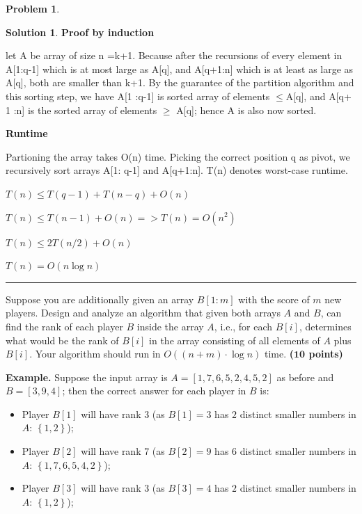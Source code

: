 \documentclass{article}
\theoremstyle{definition}
\newtheorem{problem}{Problem}
\def\fline{\rule{0.75\linewidth}{0.5pt}}
\newcommand{\finishline}{\begin{center}\fline\end{center}}
\newtheorem*{solution*}{Solution}
\newenvironment{solution}{\begin{solution*}}{{\finishline} \end{solution*}}
\newcommand{\grade}[1]{\hfill{\textbf{($\mathbf{#1}$ points)}}}
\newcommand{\set}[1]{\ensuremath{\left\{ #1 \right\}}}
\begin{document}
\begin{problem}
\begin{enumerate}
\begin{solution}
	\item \textbf{Proof by induction}
		\item let A be array of size n =k+1. Because after the recursions of every element in A[1:q-1] which is at most large as A[q], and A[q+1:n] which is at least as large as A[q], both are smaller than k+1. By the guarantee of the partition algorithm and this sorting step, 
		 we have A[1 :q-1] is sorted array of elements $\leq $A[q], and A[q+ 1 :n] is the sorted array of elements $\geq$ A[q]; hence A is also now sorted.

	\item \textbf{Runtime}
		\item Partioning the array takes O(n) time. Picking the correct position q as pivot, we recursively sort arrays A[1: q-1] and A[q+1:n]. T(n) denotes worst-case runtime.
	 \begin{center}
		\item $T(n) \leq T(q-1) + T(n-q) + O(n)$
		\item $T(n) \leq T(n-1) + O(n) => T(n) = O(n^2)$
		\item $T(n) \leq 2T(n/2) + O(n)$
		\item $T(n) = O(n \log n)$
	\end{center}

\end{solution}

    \item [(b)] Suppose you are additionally given an array $B[1:m]$ with the score of $m$ new players. Design and analyze an algorithm that given both arrays $A$ and $B$, can find the rank of each player $B$ inside the array $A$, i.e., 
    for each $B[i]$, determines what would be  the rank of $B[i]$ in the array consisting of all elements of $A$ plus $B[i]$. Your algorithm should run in $O((n+m) \cdot \log{n})$ time. \grade{10} 
      
      \medskip
  \textbf{Example.} Suppose the input array is $A=[1,7,6,5,2,4,5,2]$ as before and $B=[3,9,4]$; then the correct answer for each player in $B$ is: 
    \begin{itemize}
        \item Player $B[1]$ will have rank 3 (as $B[1]=3$ has $2$ distinct smaller numbers in $A$: $\set{1,2}$); 
        \item Player $B[2]$ will have rank 7 (as $B[2]=9$ has $6$ distinct smaller numbers in $A$: $\set{1,7,6,5,4,2}$);
        \item Player $B[3]$ will have rank 3 (as $B[3]=4$ has $2$ distinct smaller numbers in $A$: $\set{1,2}$);
    \end{itemize}
    

\end{enumerate}
\end{problem}
\end{document}
